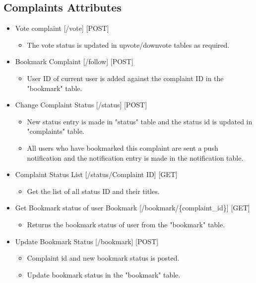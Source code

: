 \documentclass[12pt]{article}
\begin{document}
\subsection{Complaints Attributes}
\begin{itemize}
\setlength\itemsep{-0.4em}
\item Vote complaint [/vote] [POST]
\begin{itemize}
\setlength\itemsep{-0.4em}
\item The vote status is updated in upvote/downvote tables as required.
\end{itemize}
\item Bookmark Complaint [/follow] [POST]
\begin{itemize}
\setlength\itemsep{-0.4em}
\item User ID of current user is added against the complaint ID in the "bookmark" table.
\end{itemize}
\item Change Complaint Status [/status] [POST]
\begin{itemize}
\setlength\itemsep{-0.4em}
\item New status entry is made in "status" table and the status id is updated in "complaints" table.
\item All users who have bookmarked this complaint are sent a push notification and the notification entry is made in the notification table.
\end{itemize}
\item Complaint Status List [/status/{Complaint ID}] [GET]
\begin{itemize}
\setlength\itemsep{-0.4em}
\item Get the list of all status ID and their titles.
\end{itemize}
\item Get Bookmark status of user Bookmark [/bookmark/\{complaint\_id\}] [GET]
\begin{itemize}
\setlength\itemsep{-0.4em}
\item Returns the bookmark status of user from the "bookmark" table.
\end{itemize}
\item Update Bookmark Status [/bookmark] [POST]
\begin{itemize}
\setlength\itemsep{-0.4em}
\item Complaint id and new bookmark status is posted.
\item Update bookmark status in the "bookmark" table.
\end{itemize}

\end{itemize}
\end{document}
